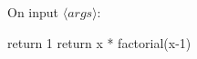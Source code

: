 \begin{algorithm}
	On input $\langle args \rangle$:
	\begin{algorithmic}[1]
		 \State 
		     \State return 1
		 \EndIf
		 \Else    \State return x * factorial(x-1)
	\end{algorithmic}
\end{algorithm}
